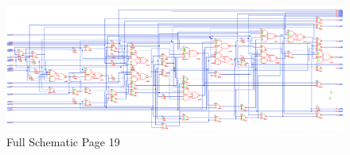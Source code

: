 \documentclass[11pt]{article}
\begin{document}
		
		\begin{figure}[H] 
			\centering 
			\includegraphics[width=\textwidth,height=\dimexpr\textheight-4\baselineskip-\abovecaptionskip-\belowcaptionskip\relax,keepaspectratio]{"Pictures/Full Schematic Page 19"}
			\caption{Full Schematic Page 19} 
			\label{fig:Full-Schematic-Page-19} 
		\end{figure}
		
\end{document}
